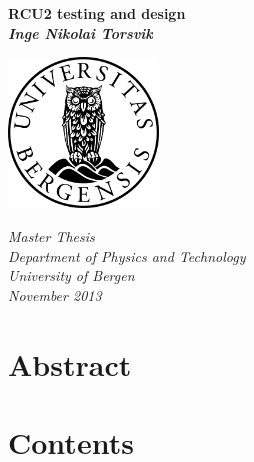\documentclass[12pt]{article}
\numberwithin{figure}{section}
\newcommand\blankpage{%
    \null
    \thispagestyle{empty}%
    \addtocounter{page}{-1}%
    \newpage}
\begin{document}
 

\thispagestyle{empty}
\begin{center}        
  \vspace{5mm}        
  \huge
  \textbf{RCU2 testing and design} \\
  \vspace{50mm}
  \Large
  {\bf{\textsl{Inge Nikolai Torsvik}}} \\
  \vspace{20mm}
  \vspace{5mm}
  \vspace{10mm}
  \centerline{\includegraphics[height=4cm,width=4cm]{uglo.png}}
  \Large
  \textsl{Master Thesis} \\
  \vspace{50mm}
  \large
  \textsl{Department of Physics and Technology} \\
  \textsl{University of Bergen} \\
  \vspace{10mm}
  \large
  \textsl{November 2013} \\

\end{center}

\newpage
\blankpage


\newpage
\setcounter{page}{1}
\section*{Abstract}

\newpage
\section*{Contents}

\newpage

\FloatBarrier

\FloatBarrier
\end{document}
